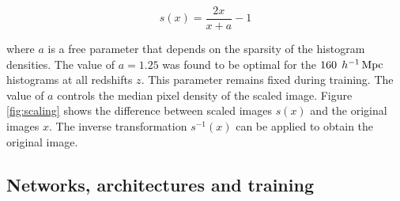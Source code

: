 \documentclass[twocolumn]{article}
\numberwithin{equation}{section}
\begin{document}
\begin{equation}
    s(x) = \frac{2x}{x+a} - 1
\end{equation}

where $a$ is a free parameter that depends on the sparsity of the histogram densities. The value of $a=1.25$ was found 
to be optimal for the $160 \:  \: h^{-1} \,\textup{Mpc}$ histograms at all redshifts $z$. This parameter remains fixed 
during training. The value of $a$ controls the median pixel density of the scaled image. Figure \ref{fig:scaling} shows 
the difference between scaled images $s(x)$ and the original images $x$. The inverse transformation $s^{-1}(x)$ can be 
applied to obtain the original image. 


\subsection{Networks, architectures and training}\label{training}

\end{document}
